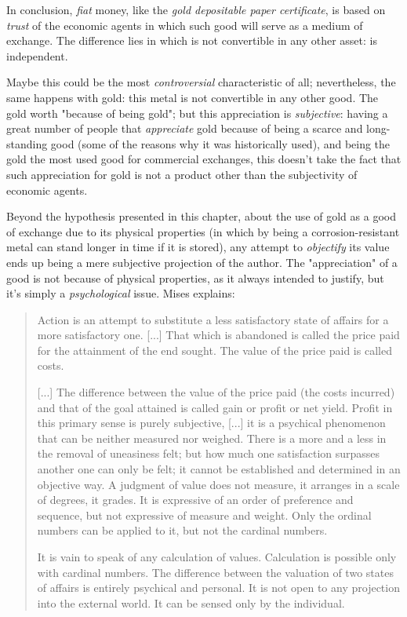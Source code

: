 \documentclass[12pt,a4paper,twoside]{book}
\begin{document}
In conclusion, \textit{fiat} money, like the \textit{gold depositable paper certificate}, is based on \textit{trust} of the economic agents in which such good will serve as a medium of exchange. The difference lies in which is not convertible in any other asset: is independent.

Maybe this could be the most \textit{controversial} characteristic of all; nevertheless, the same happens with gold: this metal is not convertible in any other good. The gold worth "because of being gold"; but this appreciation is \textit{subjective}: having a great number of people that \textit{appreciate} gold because of being a scarce and long-standing good (some of the reasons why it was historically used), and being the gold the most used good for commercial exchanges, this doesn't take the fact that such appreciation for gold is not a product other than the subjectivity of economic agents.

Beyond the hypothesis presented in this chapter, about the use of gold as a good of exchange due to its physical properties (in which by being a corrosion-resistant metal  can stand longer in time if it is stored), any attempt to \textit{objectify} its value ends up being a mere subjective projection of the author. The "appreciation" of a good is not because of physical properties, as it always intended to justify, but it's simply a \textit{psychological} issue. Mises explains:

\begin{quotation}
Action is an attempt to substitute a less satisfactory state of affairs for a more satisfactory one. [...] That which is abandoned is called the price paid for the attainment of the end sought. The value of the price paid is called costs.

[...] The difference between the value of the price paid (the costs incurred) and that of the goal attained is called gain or profit or net yield. Profit in this primary sense is purely subjective, [...] it is a psychical phenomenon that can be neither measured nor weighed. There is a more and a less in the removal of uneasiness felt; but how much one satisfaction surpasses another one can only be felt; it cannot be established and determined in an objective way. A judgment of value does not measure, it arranges in a scale of degrees, it grades. It is expressive of an order of preference and sequence, but not expressive of measure and weight. Only the ordinal numbers can be applied to it, but not the cardinal numbers.

It is vain to speak of any calculation of values. Calculation is possible only with cardinal numbers. The difference between the valuation of two states of affairs is entirely psychical and personal. It is not open to any projection into the external world. It can be sensed only by the individual. \cite[pp. 97]{mises:ha}
\end{quotation}
\end{document}
